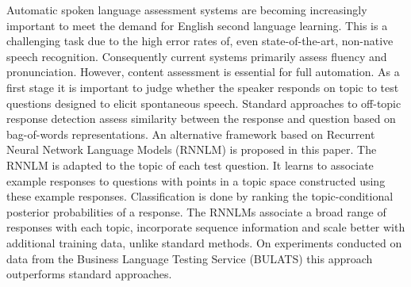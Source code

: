 Automatic spoken language assessment systems are becoming increasingly important to meet the demand for English second language learning.  This is a challenging task due to the high error rates of, even state-of-the-art, non-native speech recognition. Consequently current systems primarily assess fluency and pronunciation. However, content assessment is essential for full automation. As a first stage it is important to judge whether the speaker responds on topic to test questions designed to elicit spontaneous speech. Standard approaches to off-topic response detection assess similarity between the response and question based on bag-of-words representations. An alternative framework based on Recurrent Neural Network Language Models (RNNLM) is proposed in this paper. The RNNLM is adapted to the topic of each test question. It learns to associate example responses to questions with points in a topic space constructed using these example responses. Classification is done by ranking the topic-conditional posterior probabilities of a response. The RNNLMs associate a broad range of responses with each topic, incorporate sequence information and scale better with additional training data, unlike standard methods. On experiments conducted on data from the Business Language Testing Service (BULATS) this approach outperforms standard approaches.
